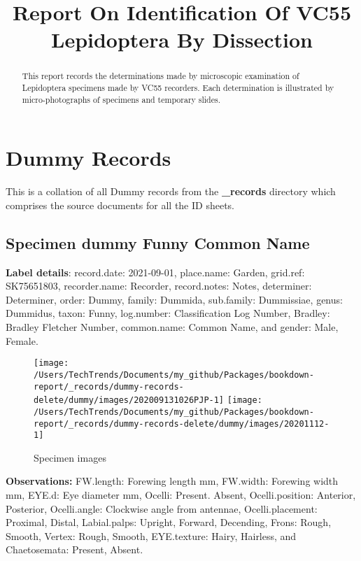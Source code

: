\documentclass[
]{article}
\title{Report On Identification Of VC55 Lepidoptera By Dissection}
\author{}
\date{\vspace{-2.5em}}
\begin{document}
\maketitle
\begin{abstract}
This report records the determinations made by microscopic examination of Lepidoptera specimens made by VC55 recorders. Each determination is illustrated by micro-photographs of specimens and temporary slides.
\end{abstract}

{
\setcounter{tocdepth}{2}
\tableofcontents
}
\hypertarget{dummy-records}{%
\section{Dummy Records}\label{dummy-records}}

This is a collation of all Dummy records from the \textbf{\_records} directory which comprises the source documents for all the ID sheets.

\hypertarget{specimen-dummy-funny-common-name}{%
\subsection*{Specimen dummy Funny Common Name}\label{specimen-dummy-funny-common-name}}

\textbf{Label details}:
record.date: 2021-09-01, place.name: Garden, grid.ref: SK75651803, recorder.name: Recorder, record.notes: Notes, determiner: Determiner, order: Dummy, family: Dummida, sub.family: Dummissiae, genus: Dummidus, taxon: Funny, log.number: Classification Log Number, Bradley: Bradley Fletcher Number, common.name: Common Name, and gender: Male, Female.

\begin{figure}

{\centering \texttt{[image: /Users/TechTrends/Documents/my\_github/Packages/bookdown-report/\_records/dummy-records-delete/dummy/images/202009131026PJP-1]} \texttt{[image: /Users/TechTrends/Documents/my\_github/Packages/bookdown-report/\_records/dummy-records-delete/dummy/images/20201112-1]} 

}

\caption{Specimen images}\label{fig:unnamed-chunk-13}
\end{figure}

\textbf{Observations:} FW.length: Forewing length mm, FW.width: Forewing width mm, EYE.d: Eye diameter mm, Ocelli: Present. Absent, Ocelli.position: Anterior, Posterior, Ocelli.angle: Clockwise angle from antennae, Ocelli.placement: Proximal, Distal, Labial.palps: Upright, Forward, Decending, Frons: Rough, Smooth, Vertex: Rough, Smooth, EYE.texture: Hairy, Hairless, and Chaetosemata: Present, Absent.
\end{document}
